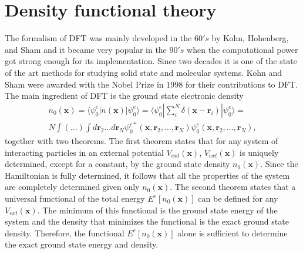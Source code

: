\section{Density functional theory}
\label{density-functional-theory}

The formalism of DFT\cite{hohenberg1964inhomogeneous,kohn1965self} was mainly developed in the $60's$ by Kohn, Hohenberg, and Sham and it became very popular in the $90's$ when the computational power got strong enough for its 
implementation. Since two decades it is one of the state of the art methods for studying solid state and molecular systems. Kohn and Sham were awarded with the Nobel Prize in $1998$ for their contributions to DFT. \\

The main ingredient of DFT is the ground state electronic density
\begin{multline}
 n_{0}(\mathbf{x})=\langle\psi_{0}^{e}|n(\mathbf{x})|\psi_{0}^{e}\rangle=\langle\psi_{0}^{e}|\sum_{i}^{N}\delta(\mathbf{x}-\mathbf{r}_{i})|\psi_{0}^{e}\rangle= \\
 N\int(\dots)\int d\mathbf{r}_{2}\dots d\mathbf{r}_{N}\psi_{0}^{e*}(\mathbf{x},\mathbf{r}_{2},\dots,\mathbf{r}_{N})\psi_{0}^{e}(\mathbf{x},\mathbf{r}_{2},\dots,\mathbf{r}_{N}),
\end{multline}
together with two theorems. The first theorem states that for any system of interacting particles in an external potential $V_{ext}(\mathbf{x})$, $V_{ext}(\mathbf{x})$ is uniquely determined, except for a constant, by the 
ground state density $n_{0}(\mathbf{x})$. Since the Hamiltonian is fully determined, it follows that all the properties of the system are completely determined given only $n_{0}(\mathbf{x})$. The second theorem states that 
a universal functional of the total energy $E^{e}[n_{0}(\mathbf{x})]$ can be defined for any $V_{ext}(\mathbf{x})$. The minimum of this functional is the ground state energy of the system and the density that minimizes 
the functional is the exact ground state density. Therefore, the functional $E^{e}[n_{0}(\mathbf{x})]$ alone is sufficient to determine the exact ground state energy and density. \\

